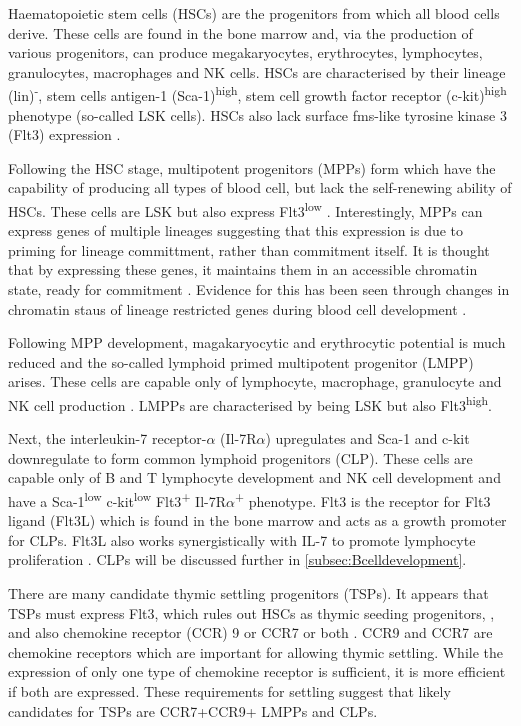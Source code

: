 Haematopoietic stem cells (HSCs) are the progenitors from which all blood cells derive.
These cells are found in the bone marrow and, via the production of various progenitors, can produce megakaryocytes, erythrocytes, lymphocytes, granulocytes, macrophages and NK cells.
HSCs are characterised by their lineage (lin)\textsuperscript{-}, stem cells antigen-1 (Sca-1)\textsuperscript{high}, stem cell growth factor receptor (c-kit)\textsuperscript{high} phenotype (so-called LSK cells). HSCs also lack surface fms-like tyrosine kinase 3 (Flt3) expression \citep{Welinder2011}.

Following the HSC stage, multipotent progenitors (MPPs) form which have the capability of producing all types of blood cell, but lack the self-renewing ability of HSCs.
These cells are LSK but also express Flt3\textsuperscript{low} \citep{Welinder2011}.
Interestingly, MPPs can express genes of multiple lineages \citep{Hu1997} suggesting that this expression is due to priming for lineage committment, rather than commitment itself.
It is thought that by expressing these genes, it maintains them in an accessible chromatin state, ready for commitment \citep{Welinder2011}.
Evidence for this has been seen through changes in chromatin staus of lineage restricted genes during blood cell development \citep{Weishaupt2010}.

Following MPP development, magakaryocytic and erythrocytic potential is much reduced and the so-called lymphoid primed multipotent progenitor (LMPP) arises.
These cells are capable only of lymphocyte, macrophage, granulocyte and NK cell production \citep{Adolfsson2005}.
LMPPs are characterised by being LSK but also Flt3\textsuperscript{high}.

Next, the interleukin-7 receptor-$\alpha$ (Il-7R$\alpha$) upregulates and Sca-1 and c-kit downregulate to form common lymphoid progenitors (CLP).
These cells are capable only of B and T lymphocyte development and NK cell development \citep{Kondo1997} and have a Sca-1\textsuperscript{low} c-kit\textsuperscript{low} Flt3\textsuperscript{+} Il-7R$\alpha$\textsuperscript{+} phenotype.
Flt3 is the receptor for Flt3 ligand (Flt3L) which is found in the bone marrow and acts as a growth promoter for CLPs.
Flt3L also works synergistically with IL-7 to promote lymphocyte proliferation \citep{Holmes2006}.
CLPs will be discussed further in \cref{subsec:Bcelldevelopment}.


There are many candidate thymic settling progenitors (TSPs).
It appears that TSPs must express Flt3, which rules out HSCs as thymic seeding progenitors, \citep{Zlotoff2011}, and also chemokine receptor (CCR) 9 or CCR7 or both \citep{Zlotoff2010}.
CCR9 and CCR7 are chemokine receptors which are important for allowing thymic settling. 
While the expression of only one type of chemokine receptor is sufficient, it is more efficient if both are expressed.
These requirements for settling suggest that likely candidates for TSPs are CCR7+CCR9+ LMPPs and CLPs\citep{Zlotoff2011}.

